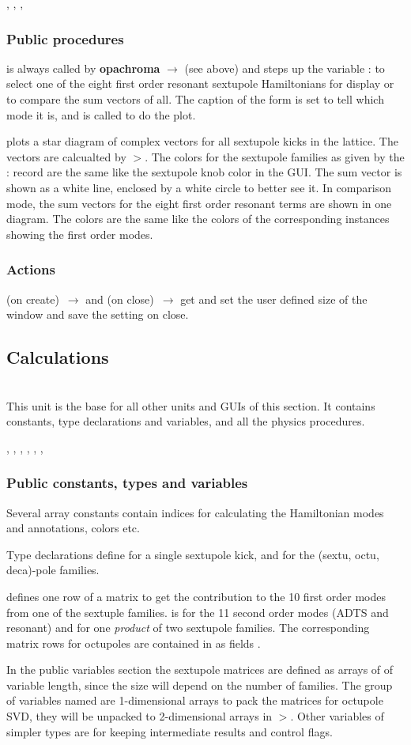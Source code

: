 \documentclass[12pt]{article}
\newcommand\code[1]{{\tt #1}}
\newcommand{\ofld}[1]{\colorbox{black!15}{{{\color{black}\bf #1}}}}
\newcommand{\ofldx}[1]{\colorbox{black!15}{{\color{black}(#1)}}}
\newcommand\guico[1]{{\color{blue}\code{#1}}}
\newcommand\guifco[1]{{\color{violet}\code{#1}}}
\newcommand{\unico}[1]{{\color{burntorange}\code{#1}}}
\newcommand{\evcod}[2]{\ofld{#1} $\rightarrow$ \guico{#2}}
\newcommand{\evcodxf}[2]{\ofldx{#1}~$\rightarrow$ \guifco{#2}}
\newcommand{\prcod}[2]{\opauni{#1}$>$\unico{#2}}
\newcommand{\vrcod}[2]{\opauni{#1}:\unico{#2}}
\newcommand{\opagui}[1]{\colorbox{blue!20}{{\color{black}\code{#1}}}}
\newcommand{\ogui}[1]{\hyperref[#1]{\opagui{#1}}}
\newcommand{\opaguif}[1]{\colorbox{violet!30}{{\color{black}\code{#1}}}}
\newcommand{\oguif}[1]{\hyperref[#1]{\opaguif{#1}}}
\newcommand{\opauni}[1]{\colorbox{orange!30}{{\color{black}\code{#1}}}}
\newcommand{\ounih}[2]{\subsection{\label{#2}#1}{\Huge\opauni{#2}}\\}
\newcommand{\ouni}[1]{\hyperref[#1]{\opauni{#1}}}
\newcommand{\uses}[1]{\flushleft {\bf Uses:} #1}
\newcommand{\desc}[1]{#1}
\newcommand{\act}[1]{\subsubsection*{Actions} #1}
\newcommand{\pvar}[1]{\subsubsection*{Public constants, types and variables} #1}
\newcommand{\ppro}[1]{\subsubsection*{Public procedures} #1}
\begin{document}
\uses{
\ouni{chromlib}, \ouni{globlib}, \ouni{mathlib}, \ouni{comfigureframe}
}

\ppro{
\guico{Init} is always called by \evcod{opachroma}{butSelectClick} (see above) and steps up the variable \vrcod{chromlib}{VSelect} to select one of the eight first order resonant sextupole Hamiltonians for display or to compare the sum vectors of all. The caption of the form is set to tell which mode it is, and \guico{Star} is called to do the plot.

\guico{Star} plots a star diagram of complex vectors for all sextupole kicks in the lattice. The vectors are calcualted by \prcod{chromlib}{getSVector}. The colors for the sextupole families as given by the \vrcod{chromlib}{SexFam} record are the same like the sextupole knob \oguif{csexframe} color in the \ogui{opachroma} GUI. The sum vector is shown as a white line, enclosed by a white circle to better see it. In comparison mode, the sum vectors for the eight first order resonant terms are shown in one diagram. The colors are the same like the colors of the corresponding \oguif{chamframe} instances showing the first order modes.
}

\act{
\evcodxf{on create}{FormCreate} and \evcodxf{on close}{FormClose} get and set the user defined size of the window and save the setting on close.
}


\ounih{Calculations}{chromlib} 

\desc{This unit is the base for all other units and GUIs of this section. It contains constants, type declarations and variables, and all the physics procedures.}

\uses{
\ouni{linoplib}, \ouni{elemlib}, \ogui{opatunediag}, \ouni{globlib}, \ouni{mathlib}, \ouni{comvgraphlib}, \ouni{comauxlib}
}


\pvar{
Several array constants contain indices for calculating the Hamiltonian modes and annotations, colors etc.

Type declarations define \unico{SextupoleType} for a single sextupole kick, and \unico{(Sex, Octu, Deca) FamType} for the (sextu, octu, deca)-pole families. 

\unico{SM1\_row} defines one row of a matrix to get the contribution to the 10 first order modes from one of the sextuple families. \unico{SM2\_row} is for the 11 second order modes (ADTS and resonant) and for one {\em product} of two sextupole families. The corresponding matrix rows for octupoles are contained in \unico{OctuFamType} as fields \unico{omat, om1}.

In the public variables section the sextupole matrices \unico{SM1, SM2} are defined as arrays of \unico{SM(1,2)\_row} of variable length, since the size will depend on the number of families. The group of variables named \unico{osvd\_\dots} are 1-dimensional arrays to pack the matrices for octupole SVD, they will be unpacked to 2-dimensional arrays in \prcod{mathlib}{SVDCMP}. Other variables of simpler types are for keeping intermediate results and control flags.
}
\end{document}
